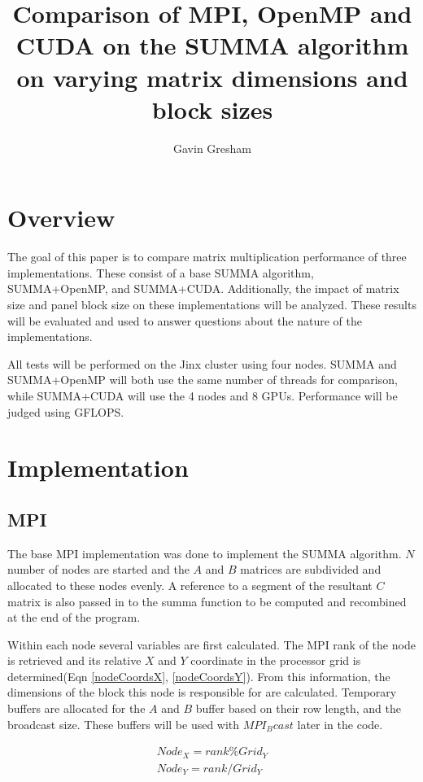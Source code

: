 \documentclass[11pt, twocolumn]{article}
\author{Gavin Gresham}
\title{Comparison of MPI, OpenMP and CUDA on the SUMMA algorithm on varying matrix dimensions and block sizes}
\begin{document}
\maketitle
\section{Overview}
The goal of this paper is to compare matrix multiplication performance of three implementations. These consist of a base SUMMA algorithm, SUMMA+OpenMP, and SUMMA+CUDA. Additionally, the impact of matrix size and panel block size on these implementations will be analyzed. These results will be evaluated and used to answer questions about the nature of the implementations.

All tests will be performed on the Jinx cluster using four nodes. SUMMA and SUMMA+OpenMP will both use the same number of threads for comparison, while SUMMA+CUDA will use the 4 nodes and 8 GPUs. Performance will be judged using GFLOPS.


\section{Implementation}
\subsection{MPI}
The base MPI implementation was done to implement the SUMMA algorithm\cite{SUMMA}. $N$ number of nodes are started and the $A$ and $B$ matrices are subdivided and allocated to these nodes evenly. A reference to a segment of the resultant $C$ matrix is also passed in to the summa function to be computed and recombined at the end of the program.

Within each node several variables are first calculated. The MPI rank of the node is retrieved and its relative $X$ and $Y$ coordinate in the processor grid is determined(Eqn \ref{nodeCoordsX}, \ref{nodeCoordsY}). From this information, the dimensions of the block this node is responsible for are calculated. Temporary buffers are allocated for the $A$ and $B$ buffer based on their row length, and the broadcast size. These buffers will be used with $MPI_Bcast$ later in the code.

\begin{eqnarray}
\label{nodeCoordsX}
Node_X = rank \% Grid_Y\\
\label{nodeCoordsY}
Node_Y = rank / Grid_Y
\end{eqnarray}
\end{document}
